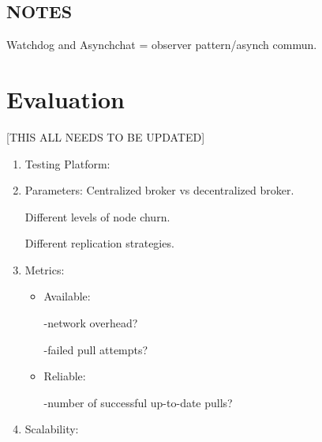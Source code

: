 \subsection{NOTES}
Watchdog and Asynchchat = observer pattern/asynch commun.

\section{Evaluation}
[THIS ALL NEEDS TO BE UPDATED]
\begin{enumerate}
\item Testing Platform:
\item Parameters:
Centralized broker vs decentralized broker.

Different levels of node churn.

Different replication strategies.
\item Metrics:
\begin{itemize}
\item Available:

-network overhead?

-failed pull attempts?
\item Reliable:

-number of successful up-to-date pulls?
\end{itemize}
\item Scalability:
\end{enumerate}
